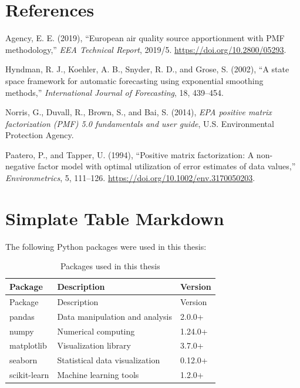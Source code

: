 \documentclass[
  letterpaper,
  oneside,
  openany]{MastersDoctoralThesis}
\newlength{\cslhangindent}
\newenvironment{CSLReferences}[2] %
 {\begin{list}{}{%
  \setlength{\itemindent}{0pt}
  \setlength{\leftmargin}{0pt}
  \setlength{\parsep}{0pt}
  \ifodd #1
   \setlength{\leftmargin}{\cslhangindent}
   \setlength{\itemindent}{-1\cslhangindent}
  \fi
  \setlength{\itemsep}{#2\baselineskip}}}
 {\end{list}}
\theoremstyle{plain}
\theoremstyle{remark}
\begin{document}

\chapter*{References}\label{references}


\label{refs}
\begin{CSLReferences}{1}{0}
Agency, E. E. (2019), {``European air quality source apportionment with
PMF methodology,''} \emph{EEA Technical Report}, 2019/5.
\url{https://doi.org/10.2800/05293}.

Hyndman, R. J., Koehler, A. B., Snyder, R. D., and Grose, S. (2002),
{``A state space framework for automatic forecasting using exponential
smoothing methods,''} \emph{International Journal of Forecasting}, 18,
439--454.

Norris, G., Duvall, R., Brown, S., and Bai, S. (2014), \emph{EPA
positive matrix factorization (PMF) 5.0 fundamentals and user guide},
U.S. Environmental Protection Agency.

Paatero, P., and Tapper, U. (1994), {``Positive matrix factorization: A
non-negative factor model with optimal utilization of error estimates of
data values,''} \emph{Environmetrics}, 5, 111--126.
\url{https://doi.org/10.1002/env.3170050203}.

\end{CSLReferences}

\cleardoublepage
{}
{}
\appendix

\chapter{Simplate Table Markdown}\label{sec-python-pkgs}

The following Python packages were used in this thesis:

\begin{longtable}[]{@{}lll@{}}
\caption{Packages used in this thesis}\label{tbl-pkgs}\tabularnewline
\toprule\noalign{}
Package & Description & Version \\
\midrule\noalign{}
\endfirsthead
\toprule\noalign{}
Package & Description & Version \\
\midrule\noalign{}
\endhead
\bottomrule\noalign{}
\endlastfoot
pandas & Data manipulation and analysis & 2.0.0+ \\
numpy & Numerical computing & 1.24.0+ \\
matplotlib & Visualization library & 3.7.0+ \\
seaborn & Statistical data visualization & 0.12.0+ \\
scikit-learn & Machine learning tools & 1.2.0+ \\
\end{longtable}
\end{document}
